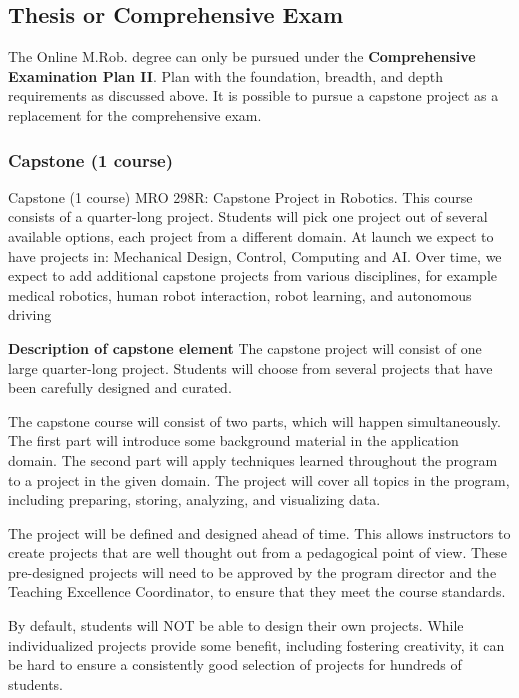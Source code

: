 \documentclass[11pt,letterpaper]{article}
\begin{document}
\subsection{Thesis or Comprehensive Exam}

The Online M.Rob. degree can only be pursued under the {\bf
  Comprehensive Examination Plan II}. Plan with the foundation,
breadth, and depth requirements as discussed above. It is possible to
pursue a capstone project as a replacement for the comprehensive exam.

\subsubsection{Capstone (1 course)}

Capstone (1 course) MRO 298R: Capstone Project in Robotics​. This
course consists of a quarter-long project. Students will pick one
project out of several available options, each project from a
different domain. At launch we expect to have projects in: Mechanical
Design, Control, Computing and AI. Over time, we expect to add
additional capstone projects from various disciplines, for example
medical robotics, human robot interaction, robot learning, and
autonomous driving

{\bf Description of capstone element}
The capstone project will consist of one large quarter-long project.
Students will choose from several projects that have been carefully
designed and curated. 

The capstone course will consist of two parts, which will happen
simultaneously. The first part will introduce some background material
in the application domain. The second part will apply techniques
learned throughout the program to a project in the given domain. The
project will cover all topics in the program, including preparing,
storing, analyzing, and visualizing data.

The project will be defined and designed ahead of time. This allows
instructors to create projects that are well thought out from a
pedagogical point of view. These pre-designed projects will need to be
approved by the program director and the Teaching Excellence
Coordinator, to ensure that they meet the course standards.

By default, students will NOT be able to design their own projects.
While individualized projects provide some benefit, including
fostering creativity, it can be hard to ensure a consistently good
selection of projects for hundreds of students.
\end{document}
